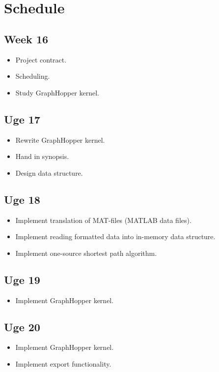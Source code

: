 \documentclass{article}
\begin{document}
\section{Schedule}
\subsection{Week 16}
\begin{itemize}
	\item Project contract.
	\item Scheduling.
	\item Study GraphHopper kernel.
\end{itemize}

\subsection{Uge 17}
\begin{itemize}
	\item Rewrite GraphHopper kernel.
	\item Hand in synopsis.
	\item Design data structure.
\end{itemize}
\subsection{Uge 18}
\begin{itemize}
	\item Implement translation of MAT-files (MATLAB data files).
	\item Implement reading formatted data into in-memory data structure.
	\item Implement one-source shortest path algorithm.
\end{itemize}
\subsection{Uge 19}
\begin{itemize}
	\item Implement GraphHopper kernel.
\end{itemize}
\subsection{Uge 20}
\begin{itemize}
	\item Implement GraphHopper kernel.
	\item Implement export functionality.
\end{itemize}
\end{document}
